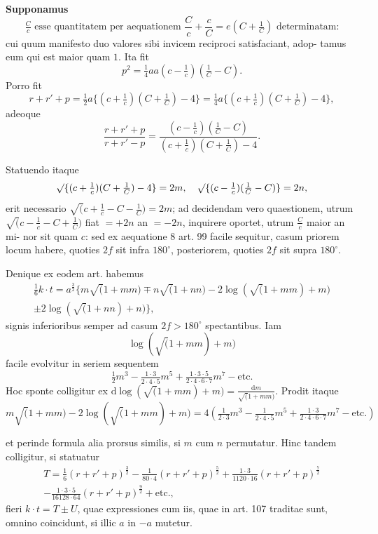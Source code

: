 \documentclass[12pt,a4paper]{article}
\newcommand{\ee}{e}
\begin{document}
\bigskip
\noindent\textbf{Supponamus}
\[
\tfrac{C}{c} \text{ esse quantitatem per aequationem } \frac{C}{c} + \frac{c}{C} = \ee(C + \tfrac{1}{C}) \text{ determinatam:}
\]
cui quum manifesto duo valores sibi invicem reciproci satisfaciant, adop-
tamus eum qui est maior quam $1$. Ita fit
\[
p^2 = \tfrac{1}{4}aa(c - \tfrac{1}{c})(\tfrac{1}{C} - C).
\]
Porro fit
\[
r + r' + p = \tfrac{1}{2}a\{(c + \tfrac{1}{c})(C + \tfrac{1}{C}) - 4\} = \tfrac{1}{4}a\{(c + \tfrac{1}{c})(C + \tfrac{1}{C}) - 4\},
\]
adeoque
\[
\frac{r + r' + p}{r + r' - p} = \frac{(c - \tfrac{1}{c})(\tfrac{1}{C} - C)}{(c + \tfrac{1}{c})(C + \tfrac{1}{C}) - 4}.
\]

Statuendo itaque
\[
\surd\{(c + \tfrac{1}{c})(C + \tfrac{1}{C}) - 4\} = 2m, \quad \surd\{(c - \tfrac{1}{c})(\tfrac{1}{C} - C)\} = 2n,
\]
erit necessario $\surd(c + \tfrac{1}{c} - C - \tfrac{1}{C}) = 2m$; ad decidendam vero quaestionem, utrum
$\surd(c - \tfrac{1}{c} - C + \tfrac{1}{C})$ fiat $= +2n$ an $= -2n$, inquirere oportet, utrum $\frac{C}{c}$ maior an mi-
nor sit quam $c$: sed ex aequatione 8 art. 99 facile sequitur, casum priorem
locum habere, quoties $2f$ sit infra $180^\circ$, posteriorem, quoties $2f$ sit supra $180^\circ$.

Denique ex eodem art. habemus
\begin{multline*}
\tfrac{1}{6}k\cdot t = a^{\frac{3}{2}}\{m\surd(1 + mm) \mp n\surd(1 + nn) - 2\log(\surd(1 + mm) + m) \\
\pm 2\log(\surd(1 + nn) + n)\},
\end{multline*}
signis inferioribus semper ad casum $2f > 180^\circ$ spectantibus. Iam
\[
\log(\surd(1 + mm) + m)
\]
facile evolvitur in seriem sequentem
\[
\tfrac{1}{2}m^3 - \tfrac{1\cdot 3}{2\cdot 4\cdot 5}m^5 + \tfrac{1\cdot 3\cdot 5}{2\cdot 4\cdot 6\cdot 7}m^7 - \text{etc.}
\]
Hoc sponte colligitur ex $\mathrm{d}\log(\surd(1 + mm) + m) = \frac{\mathrm{d}m}{\surd(1+mm)}$. Prodit itaque
\[
m\surd(1+mm) - 2\log(\surd(1+mm) + m) = 4(\tfrac{1}{2\cdot 3}m^3 - \tfrac{1}{2\cdot 4\cdot 5}m^5 + \tfrac{1\cdot 3}{2\cdot 4\cdot 6\cdot 7}m^7 - \text{etc.})
\]

et perinde formula alia prorsus similis, si $m$ cum $n$ permutatur. Hinc tandem
colligitur, si statuatur
\begin{multline*}
T = \tfrac{1}{6}(r+r'+p)^{\frac{3}{2}} - \tfrac{1}{80\cdot 4}(r+r'+p)^{\frac{5}{2}} + \tfrac{1\cdot 3}{1120\cdot 16}(r+r'+p)^{\frac{7}{2}} \\
- \tfrac{1\cdot 3\cdot 5}{16128\cdot 64}(r+r'+p)^{\frac{9}{2}} + \text{etc.},
\end{multline*}
fieri $k\cdot t = T \pm U$, quae expressiones cum iis, quae in art. 107 traditae sunt,
omnino coincidunt, si illic $a$ in $-a$ mutetur.
\end{document}
